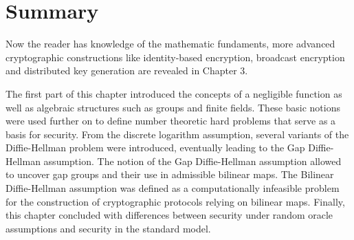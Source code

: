\section{Summary}
Now the reader has knowledge of the mathematic fundaments, more advanced cryptographic constructions like identity-based encryption, broadcast encryption and distributed key generation are revealed in Chapter 3.

The first part of this chapter introduced the concepts of a negligible function as well as algebraic structures such as groups and finite fields. These basic notions were used further on to define number theoretic hard problems that serve as a basis for security. From the discrete logarithm assumption, several variants of the Diffie-Hellman problem were introduced, eventually leading to the Gap Diffie-Hellman assumption. The notion of the Gap Diffie-Hellman assumption allowed to uncover gap groups and their use in admissible bilinear maps. The Bilinear Diffie-Hellman assumption was defined as a computationally infeasible problem for the construction of cryptographic protocols relying on bilinear maps. Finally, this chapter concluded with differences between security under random oracle assumptions and security in the standard model. 

